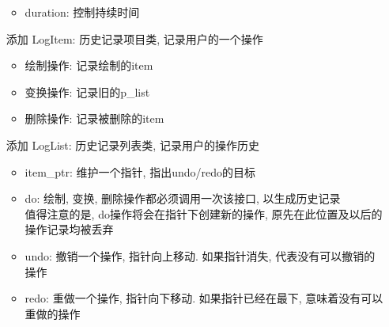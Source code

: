\documentclass[a4paper,UTF8]{article}
\theoremstyle{definition}
\begin{document}
\begin{itemize}
\begin{itemize}
    \item duration: 控制持续时间
  \end{itemize}
  \item [添加]LogItem: 历史记录项目类, 记录用户的一个操作\begin{itemize}
    \item 绘制操作: 记录绘制的item
    \item 变换操作: 记录旧的p\_list
    \item 删除操作: 记录被删除的item
  \end{itemize}
  \item [添加]LogList: 历史记录列表类, 记录用户的操作历史\begin{itemize}
    \item item\_ptr: 维护一个指针, 指出undo/redo的目标
    \item do: 绘制, 变换, 删除操作都必须调用一次该接口, 以生成历史记录\\
    值得注意的是, do操作将会在指针下创建新的操作, 原先在此位置及以后的操作记录均被丢弃
    \item undo: 撤销一个操作, 指针向上移动. 如果指针消失, 代表没有可以撤销的操作
    \item redo: 重做一个操作, 指针向下移动. 如果指针已经在最下, 意味着没有可以重做的操作
  \end{itemize}
\end{itemize}
\end{document}
